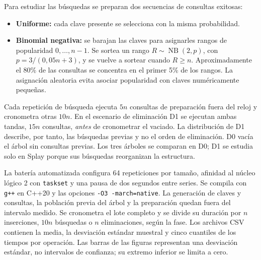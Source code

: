 \documentclass[11pt,letterpaper]{article}
\begin{document}
Para estudiar las búsquedas se preparan dos secuencias de consultas exitosas:
\begin{itemize}
    \item \textbf{Uniforme:} cada clave presente se selecciona con la misma
    probabilidad.
    \item \textbf{Binomial negativa:} se barajan las claves para asignarles
    rangos de popularidad $0,\ldots,n-1$. Se sortea un rango
    $R\sim\operatorname{NB}(2,p)$, con
    $p=3/(0{,}05n+3)$, y se vuelve a sortear cuando $R\geq n$.
    Aproximadamente el 80\% de las consultas se concentra en el primer 5\%
    de los rangos. La asignación aleatoria evita asociar popularidad con
    claves numéricamente pequeñas.
\end{itemize}

Cada repetición de búsqueda ejecuta $5n$ consultas de preparación fuera del
reloj y cronometra otras $10n$. En el escenario de eliminación D1 se ejecutan
ambas tandas, $15n$ consultas, \emph{antes} de cronometrar el vaciado. La
distribución de D1 describe, por tanto, las búsquedas previas y no el orden de
eliminación. D0 vacía el árbol sin consultas previas. Los tres árboles se
comparan en D0; D1 se estudia solo en Splay porque sus búsquedas reorganizan
la estructura.

La batería automatizada configura 64 repeticiones por tamaño, afinidad al
núcleo lógico 2 con \texttt{taskset} y una pausa de dos segundos entre series.
Se compila con \texttt{g++} en C++20 y las opciones
\texttt{-O3 -march=native}. La generación de claves y consultas, la población
previa del árbol y la preparación quedan fuera del intervalo medido. Se
cronometra el lote completo y se divide su duración por $n$ inserciones,
$10n$ búsquedas o $n$ eliminaciones, según la fase. Los archivos CSV contienen
la media, la desviación estándar muestral y cinco cuantiles de los tiempos
por operación. Las barras de las figuras representan una desviación estándar,
no intervalos de confianza; su extremo inferior se limita a cero.
\end{document}
